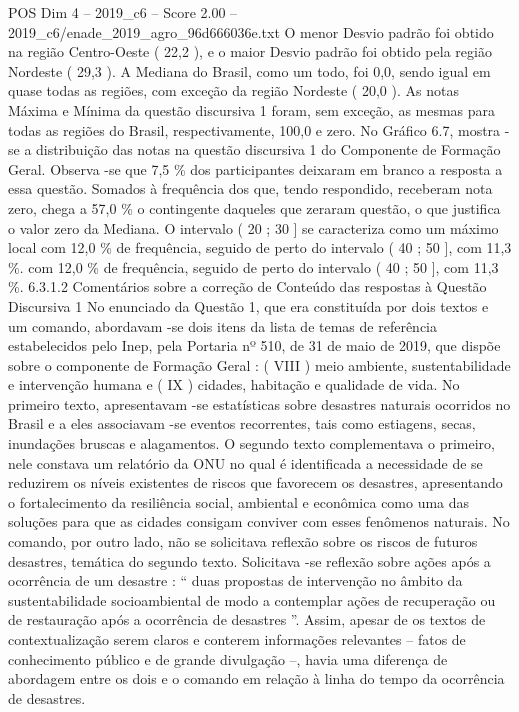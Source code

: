\begin{textsample}{POS Dim 4 – 2019\_c6 – Score 2.00 – 2019\_c6/enade\_2019\_agro\_96d666036e.txt}
O menor Desvio padrão foi obtido na região Centro-Oeste ( 22,2 ), e o maior Desvio padrão foi obtido pela região Nordeste ( 29,3 ).
A Mediana do Brasil, como um todo, foi 0,0, sendo igual em quase todas as regiões, com exceção da região Nordeste ( 20,0 ).
As notas Máxima e Mínima da questão discursiva 1 foram, sem exceção, as mesmas para todas as regiões do Brasil, respectivamente, 100,0 e zero.
No Gráfico 6.7, mostra -se a distribuição das notas na questão discursiva 1 do Componente de Formação Geral.
Observa -se que 7,5 \% dos participantes deixaram em branco a resposta a essa questão.
Somados à frequência dos que, tendo respondido, receberam nota zero, chega a 57,0 \% o contingente daqueles que zeraram questão, o que justifica o valor zero da Mediana.
O intervalo ( 20 ; 30 ] se caracteriza como um máximo local com 12,0 \% de frequência, seguido de perto do intervalo ( 40 ; 50 ], com 11,3 \%. com 12,0 \% de frequência, seguido de perto do intervalo ( 40 ; 50 ], com 11,3 \%. 6.3.1.2 Comentários sobre a correção de Conteúdo das respostas à Questão Discursiva 1 No enunciado da Questão 1, que era constituída por dois textos e um comando, abordavam -se dois itens da lista de temas de referência estabelecidos pelo Inep, pela Portaria nº 510, de 31 de maio de 2019, que dispõe sobre o componente de Formação Geral : ( VIII ) meio ambiente, sustentabilidade e intervenção humana e ( IX ) cidades, habitação e qualidade de vida.
No primeiro texto, apresentavam -se estatísticas sobre desastres naturais ocorridos no Brasil e a eles associavam -se eventos recorrentes, tais como estiagens, secas, inundações bruscas e alagamentos.
O segundo texto complementava o primeiro, nele constava um relatório da ONU no qual é identificada a necessidade de se reduzirem os níveis existentes de riscos que favorecem os desastres, apresentando o fortalecimento da resiliência social, ambiental e econômica como uma das soluções para que as cidades consigam conviver com esses fenômenos naturais.
No comando, por outro lado, não se solicitava reflexão sobre os riscos de futuros desastres, temática do segundo texto.
Solicitava -se reflexão sobre ações após a ocorrência de um desastre : “ duas propostas de intervenção no âmbito da sustentabilidade socioambiental de modo a contemplar ações de recuperação ou de restauração após a ocorrência de desastres ”.
Assim, apesar de os textos de contextualização serem claros e conterem informações relevantes – fatos de conhecimento público e de grande divulgação –, havia uma diferença de abordagem entre os dois e o comando em relação à linha do tempo da ocorrência de desastres.

\end{textsample}
